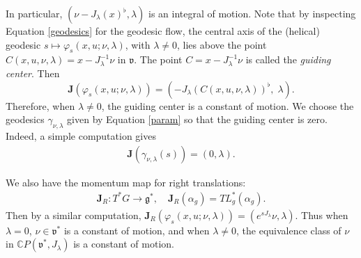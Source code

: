 \documentclass[11pt]{amsart}
\theoremstyle{plain}
\theoremstyle{definition}
\theoremstyle{remark}
\numberwithin{equation}{section}
\def\fg{\mathfrak{g}}
\def\fv{\mathfrak{v}}
\def\C{{\mathbb C}}%
\numberwithin{equation}{section}
\begin{document}
In particular, $(\nu-J_\lambda(x)^\flat, \lambda)$ is an integral of motion. Note that by inspecting Equation \eqref{geodesics} for the geodesic flow, the central axis of the (helical) geodesic $s\mapsto\varphi_s(x, u; \nu, \lambda)$, with $\lambda\neq 0$, lies above the point  $C(x, u, \nu, \lambda)=x-J_\lambda^{-1}\nu$ in $\fv$. The point $C=x-J_\lambda^{-1}\nu$ is called the \textit{guiding center}. Then $$\mathbf{J}(\varphi_s(x, u; \nu, \lambda))=\left(-J_\lambda\left(C(x, u, \nu, \lambda)\right)^\flat,\; \lambda\right).$$
Therefore, when $\lambda\neq 0$, the guiding center is a constant of motion. We choose the geodesics $\gamma_{\nu, \lambda}$ given by Equation \eqref{param} so that the guiding center is zero. Indeed, a simple computation gives
\begin{align*}
	\mathbf{J}(\gamma_{\nu, \lambda}(s))=(0, \lambda).
\end{align*} %

We also have the momentum map for right translations:
\begin{align*}
	\mathbf{J}_R: T^*G\to \fg^*, \quad \mathbf{J}_R(\alpha_g)=TL_g^*(\alpha_g).
\end{align*}
Then by a similar computation,
$\mathbf{J}_R(\varphi_s(x, u; \nu, \lambda))=(e^{sJ_\lambda}\nu, \lambda)$. Thus when $\lambda=0$, $\nu\in \fv^*$ is a constant of motion, and when $\lambda\neq 0$, the equivalence class of $\nu$ in $\C P(\fv^*, J_\lambda)$ is a constant of motion.


\printbibliography
\end{document}
